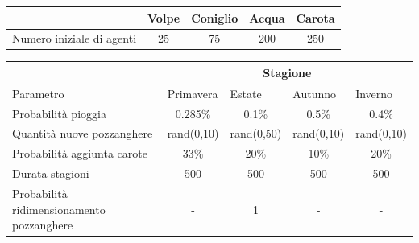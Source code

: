 \documentclass[11pt]{article}
\begin{document}
\vspace{5pt}

\begin{table}[h!]
\centering
\begin{tabular}{l|cccc}
                          & Volpe & Coniglio & Acqua & Carota \\ \hline
Numero iniziale di agenti & 25    & 75       & 200   & 250   
\end{tabular}
\end{table}

\begin{table}[h!]
\centering
\begin{tabular}{p{}|cccc}
& \multicolumn{4}{c}{Stagione} \\   
\hline
Parametro & \multicolumn{1}{l}{Primavera} & \multicolumn {1}{l}{Estate} & \multicolumn{1}{l}{Autunno} & \multicolumn{1}{l}{Inverno} \\
\hline
Probabilità pioggia  & 0.285\%  & 0.1\%  & 0.5\% & 0.4\% \\
Quantità nuove pozzanghere & rand(0,10) & rand(0,50) & rand(0,10) & rand(0,10) \\
Probabilità aggiunta carote & 33\% & 20\% & 10\% & 20\% \\
Durata stagioni & 500 & 500 & 500 & 500 \\
Probabilità ridimensionamento pozzanghere & -  & 1  & - & -                          
\end{tabular}
\end{table}





\end{document}
